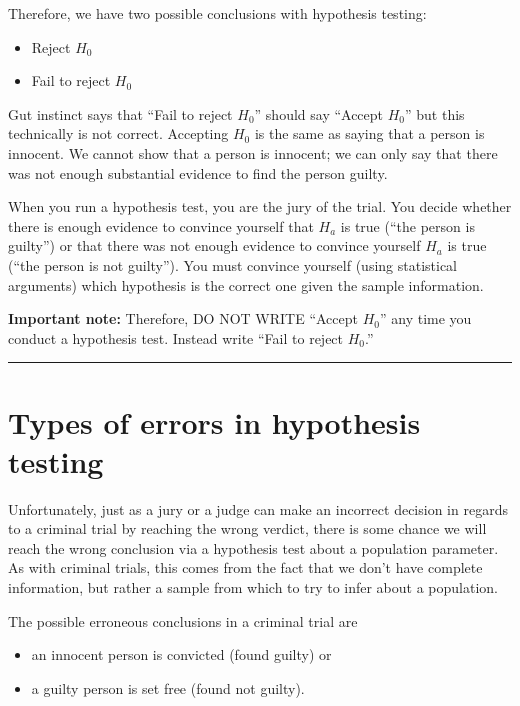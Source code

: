 \documentclass[12pt, krantz2,]{krantz}
\providecommand{\tightlist}{%
  \setlength{\itemsep}{0pt}\setlength{\parskip}{0pt}}
\begin{document}
Therefore, we have two possible conclusions with hypothesis testing:

\begin{itemize}
\tightlist
\item
  Reject \(H_0\)\\
\item
  Fail to reject \(H_0\)
\end{itemize}

Gut instinct says that ``Fail to reject \(H_0\)'' should say ``Accept \(H_0\)'' but this technically is not correct. Accepting \(H_0\) is the same as saying that a person is innocent. We cannot show that a person is innocent; we can only say that there was not enough substantial evidence to find the person guilty.

When you run a hypothesis test, you are the jury of the trial. You decide whether there is enough evidence to convince yourself that \(H_a\) is true (``the person is guilty'') or that there was not enough evidence to convince yourself \(H_a\) is true (``the person is not guilty''). You must convince yourself (using statistical arguments) which hypothesis is the correct one given the sample information.

\textbf{Important note:} Therefore, DO NOT WRITE ``Accept \(H_0\)'' any time you conduct a hypothesis test. Instead write ``Fail to reject \(H_0\).''

\begin{center}\rule{0.5\linewidth}{\linethickness}\end{center}

\hypertarget{types-of-errors-in-hypothesis-testing}{%
\section{Types of errors in hypothesis testing}\label{types-of-errors-in-hypothesis-testing}}

Unfortunately, just as a jury or a judge can make an incorrect decision in regards to a criminal trial by reaching the wrong verdict, there is some chance we will reach the wrong conclusion via a hypothesis test about a population parameter. As with criminal trials, this comes from the fact that we don't have complete information, but rather a sample from which to try to infer about a population.

The possible erroneous conclusions in a criminal trial are

\begin{itemize}
\tightlist
\item
  an innocent person is convicted (found guilty) or
\item
  a guilty person is set free (found not guilty).
\end{itemize}
\end{document}
